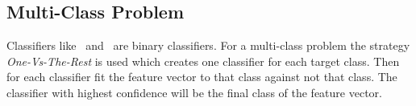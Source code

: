 \subsection{Multi-Class Problem}
Classifiers like \nb\ and \svm\ are binary classifiers. For a multi-class problem the strategy \emph{One-Vs-The-Rest} is used which creates one classifier for each target class. Then for each classifier fit the feature vector to that class against not that class. The classifier with highest confidence will be the final class of the feature vector.